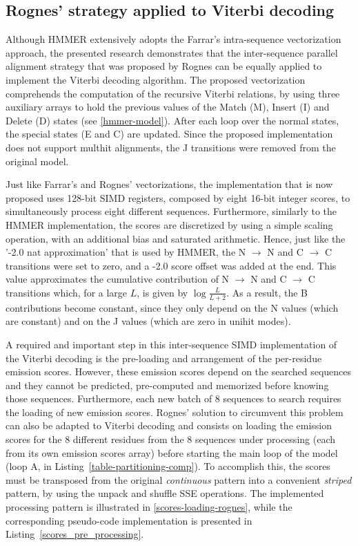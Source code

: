 \documentclass{bmcart}
\begin{document}

\subsection*{Rognes' strategy applied to Viterbi decoding}

Although HMMER extensively adopts the Farrar's intra-sequence vectorization approach, the presented research demonstrates that the inter-sequence parallel alignment strategy that was proposed by Rognes \cite{rognes} can be equally applied to implement the Viterbi decoding algorithm. The proposed vectorization comprehends the computation of the recursive Viterbi relations, by using three auxiliary arrays to hold the previous values of the Match (M), Insert (I) and Delete (D) states (see \autoref{hmmer-model}). After each loop over the normal states, the special states (E and C) are updated. Since the proposed implementation does not support multhit alignments, the J transitions were removed from the original model.

Just like Farrar's and Rognes' vectorizations, the implementation that is now proposed uses 128-bit \ac{SIMD} registers, composed by eight 16-bit integer scores, to simultaneously process eight different sequences. Furthermore, similarly to the HMMER implementation, the scores are discretized by using a simple scaling operation, with an additional bias and saturated arithmetic. Hence, just like the '-2.0 nat approximation' that is used by HMMER, the N $\rightarrow$ N and C $\rightarrow$ C transitions were  set to zero, and a -2.0 score offset was added at the end. This value approximates the cumulative contribution of N $\rightarrow$ N and C $\rightarrow$ C transitions which, for a large $L$, is given by $ \log  \frac{L}{L+2}$. As a result, the B contributions become constant, since they only depend on the N values (which are constant) and on the J values  (which are zero in unihit modes).

A required and important step in this inter-sequence \ac{SIMD} implementation of the Viterbi decoding is the pre-loading and arrangement of the per-residue emission scores. However, these emission scores depend on the searched sequences and they cannot be predicted, pre-computed and memorized before knowing those sequences. Furthermore, each new batch of 8 sequences to search requires the loading of new emission scores. Rognes' solution to circumvent this problem can also be adapted to Viterbi decoding and consists on loading the emission scores for the 8 different residues from the 8 sequences under processing (each from its own emission scores array) before starting the main loop of the model (loop A, in Listing~\ref{table-partitioning-comp}). To accomplish this, the scores must be transposed from the original \textit{continuous} pattern into a convenient \textit{striped} pattern, by using the unpack and shuffle SSE operations. The implemented processing pattern is illustrated in \autoref{scores-loading-rognes}, while the corresponding pseudo-code implementation is presented in Listing~\ref{scores_pre_processing}.
\end{document}
